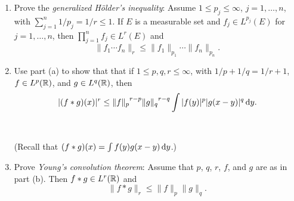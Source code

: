 \begin{problem}
  \hfill
  \begin{enumerate}[label=(\alph*)]
  \item Prove the \emph{generalized Hölder's inequality}: Assume
    \(1\leq p_j\leq\infty\), \(j=1,\dotsc,n\), with
    \(\sum_{j=1}^n 1/p_j=1/r\leq 1\). If \(E\) is a measurable set and
    \(f_j\in L^{p_j}(E)\) for \(j=1,\dotsc,n\), then
    \(\prod_{j=1}^n f_j\in L^r(E)\) and
    \[
      \|f_1\dotsm f_n\|_r\leq\|f_1\|_{p_1}\dotsm\|f_n\|_{p_n}.
    \]
  \item Use part (a) to show that that if \(1\leq p,q,r\leq\infty\), with
    \(1/p+1/q=1/r+1\), \(f\in L^p(\mathbb{R})\), and \(g\in L^q(\mathbb{R})\), then
    \[
      |(f*g)(x)|^r\leq{\|f\|_{p}}^{\cramped{r-p}}
      {\|g\|_q}^{\cramped{r-q}}
      \int|f(y)|^p|g(x-y)|^q\diff y.
    \]
    \\\\
    (Recall that \((f*g)(x)=\int f(y)g(x-y)\mathop{}\!\mathrm{d} y\).)
  \item Prove \emph{Young's convolution theorem}: Assume that \(p\), \(q\),
    \(r\), \(f\), and \(g\) are as in part (b). Then \(f*g\in L^r(\mathbb{R})\)
    and
    \[
      \|f*g\|_r\leq\|f\|_p\|g\|_q.
    \]
  \end{enumerate}
\end{problem}
